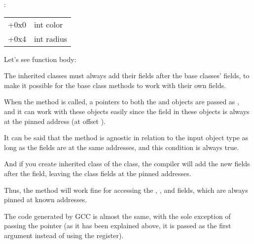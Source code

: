 :

\begin{center}
\begin{tabular}{ | l | l | }
\hline
  \tableheader{} \\
\hline
  +0x0 & int color \\
\hline
  +0x4 & int radius \\
\hline
\end{tabular}
\end{center}

Let's see \main function body:




The inherited classes must always add their fields after the base classes' fields, to make it possible for the base 
class methods to work with their own fields.


When the  method is called, a pointers to both the  and  objects are passed as ,
and it can work with these objects easily since the  field in these objects is always at the pinned address (at offset ).


It can be said that the  method is agnostic in relation to the input object type as long as the fields are 
at the same addresses, and this condition is always true.


And if you create inherited class of the  class, 
the compiler will add the new fields after the  field,
leaving the  class fields at the pinned addresses.


Thus, the  method will work fine for accessing the 
, ,  and  fields, which are always pinned at known addresses.


The code generated by GCC is almost the same, with the sole exception of passing the  pointer (as it has been explained above,
it is passed as the first argument instead of using the \ECX register).

